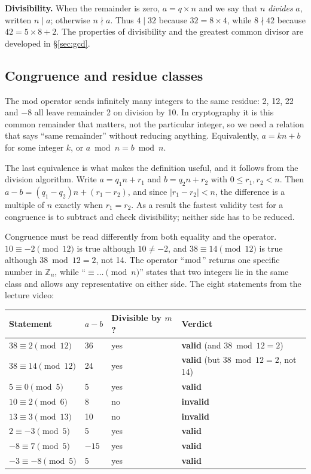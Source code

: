 \textbf{Divisibility.} When the remainder is zero, $a = q \times n$ and we say that $n$ \emph{divides} $a$, written $n \mid a$; otherwise $n \nmid a$. Thus $4 \mid 32$ because $32 = 8 \times 4$, while $8 \nmid 42$ because $42 = 5 \times 8 + 2$. The properties of divisibility and the greatest common divisor are developed in \S\ref{sec:gcd}.

\subsection{Congruence and residue classes}
The mod operator sends infinitely many integers to the same residue: 2, 12, 22 and $-8$ all leave remainder 2 on division by 10. In cryptography it is this common remainder that matters, not the particular integer, so we need a relation that says ``same remainder'' without reducing anything.  Equivalently, $a = kn + b$ for some integer $k$, or $a \bmod n = b \bmod n$.

The last equivalence is what makes the definition useful, and it follows from the division algorithm. Write $a = q_1 n + r_1$ and $b = q_2 n + r_2$ with $0 \le r_1, r_2 < n$. Then $a - b = (q_1 - q_2)n + (r_1 - r_2)$, and since $|r_1 - r_2| < n$, the difference is a multiple of $n$ exactly when $r_1 = r_2$. As a result the fastest validity test for a congruence is to subtract and check divisibility; neither side has to be reduced.

Congruence must be read differently from both equality and the operator. $10 \equiv -2 \pmod{12}$ is true although $10 \ne -2$, and $38 \equiv 14 \pmod{12}$ is true although $38 \bmod 12 = 2$, not 14. The operator ``$\bmod$'' returns one specific number in $\mathbb{Z}_n$, while ``$\equiv \dots \pmod n$'' states that two integers lie in the same class and allows any representative on either side. The eight statements from the lecture video:
\begin{center}\small
\begin{tabular}{@{}llll@{}}
\toprule
Statement & $a - b$ & Divisible by $m$? & Verdict\\
\midrule
$38 \equiv 2 \pmod{12}$ & 36 & yes & \textbf{valid} (and $38 \bmod 12 = 2$)\\
$38 \equiv 14 \pmod{12}$ & 24 & yes & \textbf{valid} (but $38 \bmod 12 = 2$, not 14)\\
$5 \equiv 0 \pmod 5$ & 5 & yes & \textbf{valid}\\
$10 \equiv 2 \pmod 6$ & 8 & no & \textbf{invalid}\\
$13 \equiv 3 \pmod{13}$ & 10 & no & \textbf{invalid}\\
$2 \equiv -3 \pmod 5$ & 5 & yes & \textbf{valid}\\
$-8 \equiv 7 \pmod 5$ & $-15$ & yes & \textbf{valid}\\
$-3 \equiv -8 \pmod 5$ & 5 & yes & \textbf{valid}\\
\bottomrule
\end{tabular}
\end{center}


